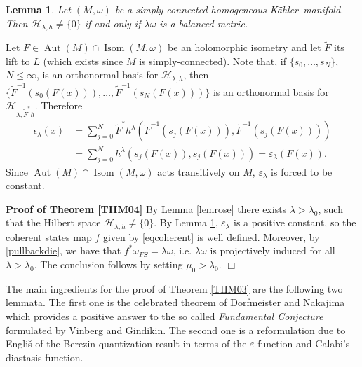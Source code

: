\documentclass[reqno]{amsart}
\newtheorem{lem}[thm]{Lemma}
\begin{document}
\begin{lem}   \label{lembal}
Let $(M, \omega)$ be a  simply-connected homogeneous {K\"{a}hler}\ manifold. Then   ${\mathcal{H}}_{\lambda,h} \neq \{0\}$ if and only if $\lambda \omega$ is a balanced metric.
\end{lem}
\proof Let $F \in {\operatorname{Aut}}(M)\cap{\operatorname{Isom}}(M,\omega)$ be an holomorphic isometry and let ${\widetilde{F}}$ its lift to $L$ (which exists since $M$ is simply-connected). Note that, if $\lbrace s_0, \dots,s_N\rbrace$, $N\leq\infty$, is an orthonormal basis for ${\mathcal{H}}_{{\lambda}, h}$, then $\lbrace{\widetilde{{ F}}}^{-1} \left( s_0\left(F\left(x\right) \right)\right),\dots , {\widetilde{{ F}}}^{-1} \left( s_N\left(F\left(x\right) \right)\right)\rbrace$ is an orthonormal basis for ${\mathcal{H}}_{{\lambda},{\widetilde{{ F}}} ^*h}$. 
Therefore
\begin{equation*}
\begin{split}
\epsilon_{\lambda}(x)
&=\sum_{j=0}^N {\widetilde{{F}}}^* h^{\lambda} \left( {\widetilde{{F}}}^{-1}(s_j(F(x))),{\widetilde{{F}}}^{-1}(s_j(F(x)))\right) \\
&=\sum_{j=0}^N h^{\lambda}\left( s_j(F(x)), s_j(F(x)) \right)=\varepsilon_{\lambda}\left(F(x)\right).
\end{split}
\end{equation*}
Since ${\operatorname{Aut}}(M)\cap{\operatorname{Isom}}(M,\omega)$ acts transitively on $M$, $\varepsilon_{\lambda}$ is forced to be constant. 
\endproof

\noindent
{\bf Proof of Theorem \ref{THM04}}\label{proofthm1}
By Lemma \ref{lemrose} 
there exists ${\lambda} > {\lambda}_0$, such that the Hilbert space 
${\mathcal{H}}_{{\lambda}, h}\neq \{0\}$.
By Lemma \ref{lembal}, $\varepsilon_{\lambda}$ is a positive constant, so the coherent states map $f$ given by \eqref{eqcoherent} is well defined. Moreover, by \eqref{pullbackdie}, we have that $f^*\omega_{FS}={\lambda} \omega$, i.e. ${\lambda} \omega$ is projectively induced  for all ${\lambda} > {\lambda}_0$. The conclusion follows by setting $\mu_0 >{\lambda}_0$. {\hspace*{\fill}$\Box$}

\vskip 0.5cm

The main ingredients for the proof of Theorem \ref{THM03} are the following two lemmata.
The first one is the celebrated theorem of Dorfmeister and Nakajima which provides a positive answer to the so called \emph{Fundamental Conjecture} formulated by Vinberg and Gindikin. The second one  is a reformulation due to  Engli\v{s}  of the Berezin   quantization result       in terms of the ${{\varepsilon}}$-function   and  Calabi's diastasis function.
\end{document}
